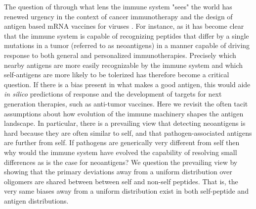 \documentclass[superscriptaddress,twocolumn,pre]{revtex4}
\newcommand{\<}{\langle}
\renewcommand{\>}{\rangle}
\begin{document}
The question of through what lens the immune system "sees" the world has renewed urgency in the context of cancer immunotherapy and the design of antigen based mRNA vaccines for viruses \cite{Luksza2017,Balachandran2017,Richman2019}. For instance, as it has become clear that the immune system is capable of recognizing peptides that differ by a single mutations in a tumor (referred to as neoantigens) in a manner capable of driving response to both general and personalized immunotherapies. Precisely which nearby antigens are more easily recognizable by the immune system and which self-antigens are more likely to be tolerized has therefore become a critical question. If there is a bias present in what makes a good antigen, this would aide {\it in silico} predictions of response and the development of targets for next generation therapies, such as anti-tumor vaccines. Here we revisit the often tacit assumptions about how evolution of the immune machinery shapes the antigen landscape. In particular, there is a prevailing view that detecting neoantigens is hard because they are often similar to self, and that pathogen-associated antigens are further from self. If pathogens are generically very different from self then why would the immune system have evolved the capability of resolving small differences as is the case for neoantigens? We question the prevailing view by showing that the primary deviations away from a uniform distribution over oligomers are shared between between self and non-self peptides. That is, the very same biases away from a uniform distribution exist in both self-peptide and antigen distributions.
\end{document}
